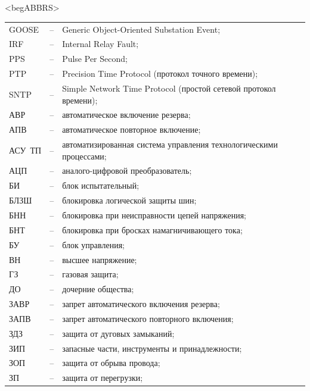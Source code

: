 \color{unimain}\section*{}
{\color{white}\fontsize{0.1pt}{0.1pt}\selectfont<begABBRS>}
\color{black}
\begin{longtable}{>{\raggedright\arraybackslash}m{2cm}>{\raggedright\arraybackslash}m{0.5cm}>{\raggedright\arraybackslash}m{20cm}}
\endfirsthead\endhead\endfoot\endlastfoot
GOOSE & -- & Generic Object-Oriented Substation Event; \\
IRF & -- & Internal Relay Fault; \\
PPS & -- & Pulse Per Second; \\
PTP & -- & Precision Time Protocol (протокол точного времени); \\
SNTP & -- & Simple Network Time Protocol (простой сетевой протокол времени); \\
АВР & -- & автоматическое включение резерва; \\
АПВ & -- & автоматическое повторное включение; \\
АСУ~ТП & -- & автоматизированная система управления технологическими процессами; \\
АЦП & -- & аналого-цифровой преобразователь; \\
БИ & -- & блок испытательный; \\
БЛЗШ & -- & блокировка логической защиты шин; \\
БНН & -- & блокировка при неисправности цепей напряжения; \\
БНТ & -- & блокировка при бросках намагничивающего тока; \\
БУ & -- & блок управления; \\
ВН & -- & высшее напряжение; \\
ГЗ & -- & газовая защита; \\
ДО & -- & дочерние общества; \\
ЗАВР & -- & запрет автоматического включения резерва; \\
ЗАПВ & -- & запрет автоматического повторного включения; \\
ЗДЗ & -- & защита от дуговых замыканий; \\
ЗИП & -- & запасные части, инструменты и принадлежности; \\
ЗОП & -- & защита от обрыва провода; \\
ЗП & -- & защита от перегрузки; \\

\end{longtable}

